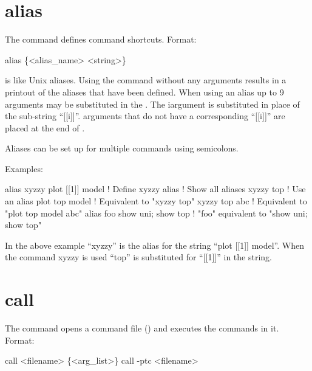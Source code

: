 
\vfil
\break

\section{alias}
\label{s:alias}

The  command defines command shortcuts. Format:
\begin{example}
  alias \{<alias_name> <string>\}
\end{example}

\vskip 7pt

 is like Unix aliases. Using the  command without any arguments
results in a printout of the aliases that have been defined. When using an alias up to 9
arguments may be substituted in the . The i\Th argument is substituted in
place of the sub-string ``[[i]]''.  arguments that do not have a corresponding ``[[i]]''
are placed at the end of .

Aliases can be set up for multiple commands using semicolons.

Examples:
\begin{example}
    alias xyzzy plot [[1]] model  ! Define xyzzy
    alias                         ! Show all aliases
    xyzzy top                     ! Use an alias
    plot top model                ! Equivalent to "xyzzy top"
    xyzzy top abc                 ! Equivalent to "plot top model abc"
    alias foo  show uni; show top ! "foo" equivalent to "show uni; show top"
\end{example}
In the above example ``xyzzy'' is the alias for the string ``plot [[1]] model''.  When the
command xyzzy is used ``top'' is substituted for ``[[1]]'' in the string.

\section{call}
\label{s:call}

The  command opens a command file () and executes the
commands in it.  Format:
\begin{example}
  call <filename> \{<arg_list>\}  \Strut
  call -ptc <filename>
\end{example}


